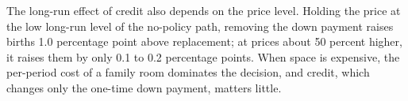 The long-run effect of credit also depends on the price level. Holding the
price at the low long-run level of the no-policy path, removing the down
payment raises births 1.0 percentage point above replacement; at prices about
50 percent higher, it raises them by only 0.1 to 0.2 percentage points. When space is expensive,
the per-period cost of a family room dominates the decision, and credit, which
changes only the one-time down payment, matters little.
